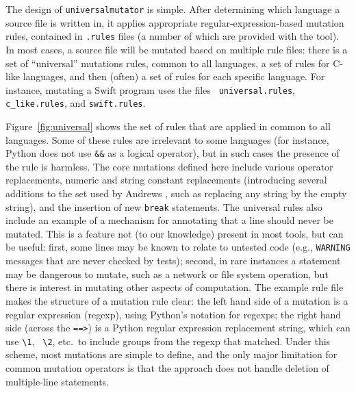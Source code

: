 The design of {\tt universalmutator} is simple.  After determining
which language a source file is written in, it applies appropriate
regular-expression-based mutation rules, contained in {\tt .rules}
files (a number of which are provided with the tool).  In most cases, a source file will be mutated based on multiple
rule files:  there is a set of ``universal'' mutations rules, common
to all languages, a set of rules for C-like languages, and then
(often) a set of rules for each specific language.  For instance,
mutating a Swift program uses the files {\tt
  universal.rules}, {\tt c\_like.rules}, and {\tt swift.rules}.

Figure~\ref{fig:universal} shows the set of rules that are applied in
common to all languages.  Some of these rules are irrelevant to some
languages (for instance, Python does not use {\tt \&\&} as a logical
operator), but in such cases the presence of the rule is harmless.  The
core mutations defined here include various operator replacements,
numeric and string constant replacements (introducing several
additions to the set used by Andrews \cite{mutant}, such as replacing
any string by the empty string), and the insertion of new {\tt break}
statements.  The universal rules also include an example of a
mechanism for annotating that a line should never be mutated.  This is
a feature not (to our knowledge) present in most tools, but can be
useful:  first, some lines may be known to relate to untested code
(e.g., {\tt WARNING} messages that are never checked by tests);
second, in rare instances a statement may be dangerous to mutate, such
as a network or file system operation, but there is interest in
mutating other aspects of computation.  The example rule file makes
the structure of a mutation rule clear:  the left hand side of a
mutation is a regular expression (regexp), using Python's notation for regexps;
the right hand side (across the {\tt ==>}) is a Python regular
expression replacement string, which can use {\tt \textbackslash 1}, {\tt
  \textbackslash 2},
etc.\ to include groups from the regexp that matched.  Under this
scheme, most mutations are simple to define, and the only major
limitation for common mutation operators is that the approach does not
handle deletion of multiple-line statements.

